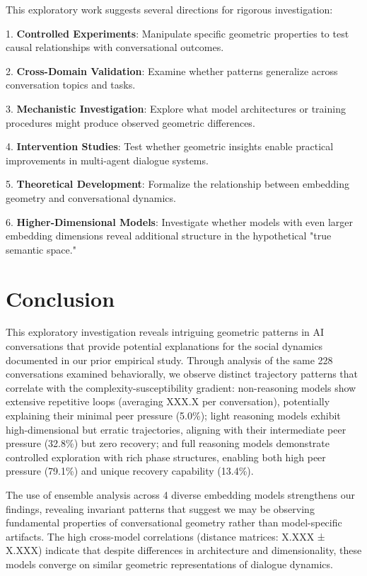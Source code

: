\documentclass[11pt,letterpaper]{article}
\newcommand{\totalConversations}{228}
\newcommand{\fullReasoningPeerPressure}{79.1\%}
\newcommand{\lightReasoningPeerPressure}{32.8\%}
\newcommand{\nonReasoningPeerPressure}{5.0\%}
\newcommand{\fullReasoningRecovery}{13.4\%}
\newcommand{\nonLoops}{XXX.X}
\newcommand{\ensembleModels}{4}
\newcommand{\ensembleDistanceCorr}{X.XXX}
\newcommand{\ensembleDistanceCorrStd}{X.XXX}
\begin{document}
This exploratory work suggests several directions for rigorous investigation:

1. \textbf{Controlled Experiments}: Manipulate specific geometric properties to test causal relationships with conversational outcomes.

2. \textbf{Cross-Domain Validation}: Examine whether patterns generalize across conversation topics and tasks.

3. \textbf{Mechanistic Investigation}: Explore what model architectures or training procedures might produce observed geometric differences.

4. \textbf{Intervention Studies}: Test whether geometric insights enable practical improvements in multi-agent dialogue systems.

5. \textbf{Theoretical Development}: Formalize the relationship between embedding geometry and conversational dynamics.

6. \textbf{Higher-Dimensional Models}: Investigate whether models with even larger embedding dimensions reveal additional structure in the hypothetical "true semantic space."

\section{Conclusion}

This exploratory investigation reveals intriguing geometric patterns in AI conversations that provide potential explanations for the social dynamics documented in our prior empirical study. Through analysis of the same \totalConversations{} conversations examined behaviorally, we observe distinct trajectory patterns that correlate with the complexity-susceptibility gradient: non-reasoning models show extensive repetitive loops (averaging \nonLoops{} per conversation), potentially explaining their minimal peer pressure (\nonReasoningPeerPressure{}); light reasoning models exhibit high-dimensional but erratic trajectories, aligning with their intermediate peer pressure (\lightReasoningPeerPressure{}) but zero recovery; and full reasoning models demonstrate controlled exploration with rich phase structures, enabling both high peer pressure (\fullReasoningPeerPressure{}) and unique recovery capability (\fullReasoningRecovery{}).

The use of ensemble analysis across \ensembleModels{} diverse embedding models strengthens our findings, revealing invariant patterns that suggest we may be observing fundamental properties of conversational geometry rather than model-specific artifacts. The high cross-model correlations (distance matrices: \ensembleDistanceCorr{} ± \ensembleDistanceCorrStd{}) indicate that despite differences in architecture and dimensionality, these models converge on similar geometric representations of dialogue dynamics.
\end{document}

